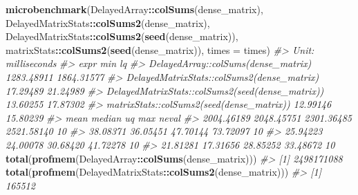\documentclass[]{book}
\newenvironment{Shaded}{\begin{snugshade}}{\end{snugshade}}
\newcommand{\KeywordTok}[1]{\textcolor[rgb]{0.13,0.29,0.53}{\textbf{#1}}}
\newcommand{\DataTypeTok}[1]{\textcolor[rgb]{0.13,0.29,0.53}{#1}}
\newcommand{\CommentTok}[1]{\textcolor[rgb]{0.56,0.35,0.01}{\textit{#1}}}
\newcommand{\OperatorTok}[1]{\textcolor[rgb]{0.81,0.36,0.00}{\textbf{#1}}}
\newcommand{\NormalTok}[1]{#1}
\begin{document}
\begin{Shaded}
\begin{Highlighting}[]
\KeywordTok{microbenchmark}\NormalTok{(DelayedArray}\OperatorTok{::}\KeywordTok{colSums}\NormalTok{(dense_matrix),}
\NormalTok{               DelayedMatrixStats}\OperatorTok{::}\KeywordTok{colSums2}\NormalTok{(dense_matrix),}
\NormalTok{               DelayedMatrixStats}\OperatorTok{::}\KeywordTok{colSums2}\NormalTok{(}\KeywordTok{seed}\NormalTok{(dense_matrix)),}
\NormalTok{               matrixStats}\OperatorTok{::}\KeywordTok{colSums2}\NormalTok{(}\KeywordTok{seed}\NormalTok{(dense_matrix)),}
               \DataTypeTok{times =}\NormalTok{ times)}
\CommentTok{#> Unit: milliseconds}
\CommentTok{#>                                              expr        min         lq}
\CommentTok{#>               DelayedArray::colSums(dense_matrix) 1283.48911 1864.31577}
\CommentTok{#>        DelayedMatrixStats::colSums2(dense_matrix)   17.29489   21.24989}
\CommentTok{#>  DelayedMatrixStats::colSums2(seed(dense_matrix))   13.60255   17.87302}
\CommentTok{#>         matrixStats::colSums2(seed(dense_matrix))   12.99146   15.80239}
\CommentTok{#>        mean     median         uq        max neval}
\CommentTok{#>  2004.46189 2048.45751 2301.36485 2521.58140    10}
\CommentTok{#>    38.08371   36.05451   47.70144   73.72097    10}
\CommentTok{#>    25.94223   24.00078   30.68420   41.72278    10}
\CommentTok{#>    21.81281   17.31656   28.85252   33.48672    10}
\KeywordTok{total}\NormalTok{(}\KeywordTok{profmem}\NormalTok{(DelayedArray}\OperatorTok{::}\KeywordTok{colSums}\NormalTok{(dense_matrix)))}
\CommentTok{#> [1] 2498171088}
\KeywordTok{total}\NormalTok{(}\KeywordTok{profmem}\NormalTok{(DelayedMatrixStats}\OperatorTok{::}\KeywordTok{colSums2}\NormalTok{(dense_matrix)))}
\CommentTok{#> [1] 165512}


\end{Highlighting}
\end{Shaded}
\end{document}
